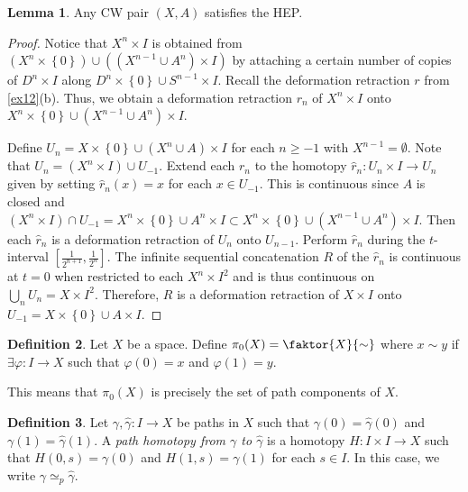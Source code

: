 \documentclass[10pt,letterpaper,cm]{nupset}
\theoremstyle{definition}
\newtheorem{definition}{Definition}[subsection]
\theoremstyle{theorem}
\newtheorem{lemma}[definition]{Lemma}
\theoremstyle{remark}
\newcommand{\1}{\mathbb{1}}
\newcommand{\0}{\vec 0}
\begin{document}
\begin{lemma}
Any CW pair $\left(X,A\right)$ satisfies the HEP.
\end{lemma}
\begin{proof}
Notice that $X^n \times I$ is obtained from $\left(X^n \times \left\{0\right\}\right) \cup \left(\left(X^{n-1} \cup A^n\right) \times I\right)$ by attaching a certain number of copies of $D^n \times I$ along $D^n \times \left\{0\right\} \cup S^{n-1} \times I$. Recall the deformation retraction $r$ from  \cref{ex12}(b). Thus, we obtain a deformation retraction $r_n$ of $X^n \times I$ onto $X^n \times \left\{0\right\} \cup \left(X^{n-1} \cup A^n\right) \times I$.

Define $U_n = X\times \left\{0\right\} \cup (X^n \cup A) \times I$ for each $n\geq -1$ with $X^{n-1} = \emptyset$. Note that $U_n = \left(X^n \times I\right) \cup U_{-1}$. Extend each $r_n$ to the homotopy $\hat{r}_n : U_n \times I \to U_n$ given by setting $\hat{r}_n(x) = x$ for each $x\in U_{-1}$. This is continuous since $A$ is closed and $\left(X^n \times I\right) \cap U_{-1} = X^n \times \left\{0\right\} \cup A^n \times I \subset X^n \times \left\{0\right\} \cup \left(X^{n-1} \cup A^n\right) \times I$. Then each $\hat{r}_n$ is a deformation retraction of $U_n$ onto $U_{n-1}$.  Perform $\hat{r}_n$ during the $t$-interval $\left[\frac{1}{2^{n+1}}, \frac{1}{2^n}\right]$.  The infinite sequential concatenation $R$ of the $\hat{r}_n$ is continuous at $t=0$ when restricted to each $X^n \times I^2$  and is thus continuous on $\bigcup_n U_n = X \times I^2$. Therefore, $R$ is a deformation retraction of $X\times I$ onto $U_{-1} = X\times \left\{0\right\} \cup A\times I$.
\end{proof}

\begin{definition}
Let $X$ be a space. Define $\pi_0(X) = \faktor{X}{\sim} $ where $x\sim y$ if $\exists \varphi: I \to X$ such that $\varphi(0)=x$ and $\varphi(1) = y$.
\end{definition}

This means that $\pi_0(X)$ is precisely the set of path components of $X$.

\begin{definition}
Let $\gamma, \hat{\gamma}: I \to X$ be paths in $X$ such that $\gamma(0) = \hat{\gamma}(0)$ and $\gamma(1) = \hat{\gamma}(1)$.  A \textit{path homotopy from $\gamma$ to $\hat{\gamma}$} is a homotopy $H: I \times I \to X$ such that $H(0,s) = \gamma(0)$ and $H(1,s) = \gamma(1)$ for each $s\in I$. In this case, we write $\gamma \simeq_p \hat{\gamma}$.
\end{definition}
\end{document}
